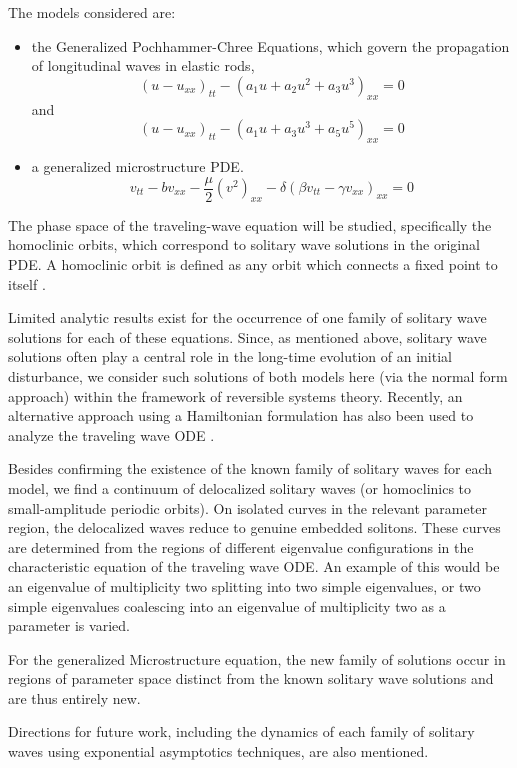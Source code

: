 The models considered are:
\begin{itemize}
\item the Generalized Pochhammer-Chree Equations, which  govern the
propagation of longitudinal waves in elastic rods,
\begin{equation}\label{eq:GPC1}
\left( u - u_{xx} \right)_{tt} - \left( a_1 u + a_2 u^2 + a_3 u^3 \right)_{xx} =0  
\end{equation}
and
\begin{equation}  \label{eq:GPC2} 
\left( u - u_{xx} \right)_{tt} - \left( a_1 u + a_3 u^3 + a_5 u^5 \right)_{xx} =0
\end{equation}

\item a generalized microstructure PDE.
\begin{equation}\label{eq:MS}
v_{tt} - b v_{xx} - \frac{\mu}{2} \left( v^2 \right)_{xx} - \delta \left( \beta v_{tt} - \gamma v_{xx}\right)_{xx} = 0 
\end{equation}
\end{itemize}

The phase space of the traveling-wave equation will be studied, specifically the
homoclinic orbits, which correspond to solitary wave solutions in the original
PDE. A homoclinic orbit is defined as any orbit which connects a fixed point to
itself \cite{Strogatz}.

Limited analytic results exist for the occurrence of one family
of  solitary wave solutions for each of these equations. Since, as
mentioned above, solitary wave solutions often play a central role in
the long-time evolution of an initial disturbance, we consider
such solutions of both models here (via the normal form approach)
within the framework of reversible systems theory. Recently, an
alternative approach using a Hamiltonian formulation has also
been used to analyze the traveling wave ODE \cite{LiZhang}.

Besides confirming the existence of the known family of solitary waves for each
model, we find a continuum of delocalized solitary waves (or homoclinics to
small-amplitude periodic orbits).  On isolated curves in the relevant parameter
region, the delocalized waves reduce to genuine embedded solitons.  These curves
are determined from the regions of different eigenvalue configurations in the
characteristic equation of the traveling wave ODE. An example of this
would be an eigenvalue of multiplicity two splitting into two simple eigenvalues,
or two simple eigenvalues coalescing into an eigenvalue of multiplicity two
as a parameter is varied.

For the generalized Microstructure equation, the new family of solutions occur
in regions of parameter space distinct from the known solitary wave solutions
and are thus entirely new.

Directions for future work, including the dynamics of each family of
solitary waves using exponential asymptotics techniques, are also mentioned.


